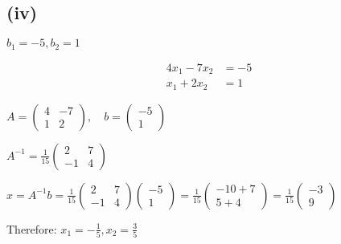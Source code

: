 \subsection*{(iv)} $b_1 = -5, b_2 = 1$

\begin{align}
	4x_1 - 7x_2 & = -5 \\
	x_1 + 2x_2  & = 1
\end{align}

$A = \begin{pmatrix}
	4 & -7 \\
	1 & 2
\end{pmatrix}, \quad b = \begin{pmatrix}
	-5 \\
	1
\end{pmatrix}$

$A^{-1} = \frac{1}{15}\begin{pmatrix}
	2 & 7 \\
	-1 & 4
\end{pmatrix}$

$x = A^{-1}b = \frac{1}{15}\begin{pmatrix}
	2 & 7 \\
	-1 & 4
\end{pmatrix}\begin{pmatrix}
	-5 \\
	1
\end{pmatrix} = \frac{1}{15}\begin{pmatrix}
	-10 + 7 \\
	5 + 4
\end{pmatrix} = \frac{1}{15}\begin{pmatrix}
	-3 \\
	9
\end{pmatrix}$

Therefore: $x_1 = -\frac{1}{5}, x_2 = \frac{3}{5}$